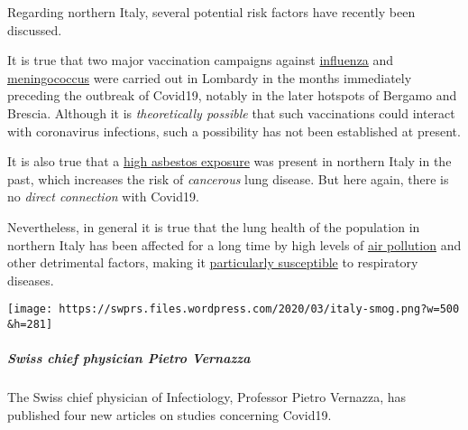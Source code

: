 Regarding northern Italy, several potential risk factors have recently
been discussed.

It is true that two major vaccination campaigns against
\href{https://www.bergamonews.it/2019/10/21/vaccinazione-antinfluenzale-a-bergamo-ordinate-185-000-dosi-di-vaccino/332164/}{influenza}
and
\href{https://www.bsnews.it/2020/01/18/meningite-vaccinate-34mila-persone-tra-brescia-e-bergamo/}{meningococcus}
were carried out in Lombardy in the months immediately preceding the
outbreak of Covid19, notably in the later hotspots of Bergamo and
Brescia. Although it is \emph{theoretically possible} that such
vaccinations could interact with coronavirus infections, such a
possibility has not been established at present.

It is also true that a
\href{https://www.spiegel.de/panorama/justiz/asbest-prozess-in-italien-nun-sind-alle-krank-a-666421.html}{high
asbestos exposure} was present in northern Italy in the past, which
increases the risk of \emph{cancerous} lung disease. But here again,
there is no \emph{direct connection} with Covid19.

Nevertheless, in general it is true that the lung health of the
population in northern Italy has been affected for a long time by high
levels of \href{https://twitter.com/esa/status/1238480433047916545}{air
pollution} and other detrimental factors, making it
\href{https://www.thelocal.it/20170131/our-lungs-are-breaking-smog-levels-way-above-safe-limits-in-northern-italy}{particularly
susceptible} to respiratory diseases.

\texttt{[image: https://swprs.files.wordpress.com/2020/03/italy-smog.png?w=500\\\&h=281]}

\hypertarget{swiss-chief-physician-pietro-vernazza}{%
\subparagraph{\texorpdfstring{\textbf{Swiss chief physician Pietro
Vernazza}}{Swiss chief physician Pietro Vernazza}}\label{swiss-chief-physician-pietro-vernazza}}

The Swiss chief physician of Infectiology, Professor Pietro Vernazza,
has published four new articles on studies concerning Covid19.

